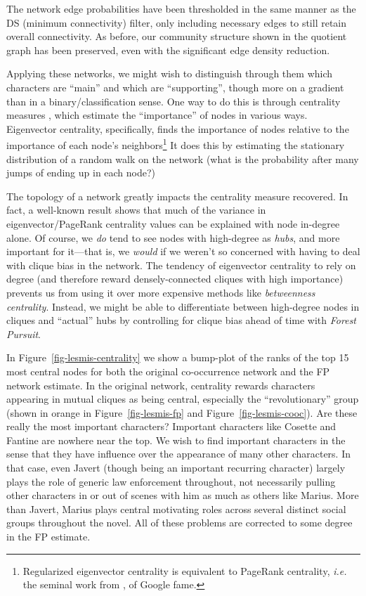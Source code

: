 \documentclass[%
	12pt,
		oneside,
		letterpaper
]{book}
\begin{document}
The network edge probabilities have been thresholded in the same manner
as the DS (minimum connectivity) filter, only including necessary edges
to still retain overall connectivity. As before, our community structure
shown in the quotient graph has been preserved, even with the
significant edge density reduction.

Applying these networks, we might wish to distinguish through them which
characters are ``main'' and which are ``supporting'', though more on a
gradient than in a binary/classification sense. One way to do this is
through centrality measures
\autocite{Mathematicsnetworks_Newman2018,atlasaspiringnetwork_Coscia2021},
which estimate the ``importance'' of nodes in various ways. Eigenvector
centrality, specifically, finds the importance of nodes relative to the
importance of each node's neighbors\footnote{ Regularized eigenvector
  centrality is equivalent to PageRank centrality, \emph{i.e.} the
  seminal work from \autocite{PageRankCitationRanking_Page1999}, of
  Google fame.} It does this by estimating the stationary distribution
of a random walk on the network (what is the probability after many
jumps of ending up in each node?)

The topology of a network greatly impacts the centrality measure
recovered. In fact, a well-known result shows that much of the variance
in eigenvector/PageRank centrality values can be explained with node
in-degree alone.\autocite{ApproximatingPageRankDegree_Fortunato} Of
course, we \emph{do} tend to see nodes with high-degree as \emph{hubs},
and more important for it---that is, we \emph{would} if we weren't so
concerned with having to deal with clique bias in the network. The
tendency of eigenvector centrality to rely on degree (and therefore
reward densely-connected cliques with high importance) prevents us from
using it over more expensive methods like \emph{betweenness centrality}.
Instead, we might be able to differentiate between high-degree nodes in
cliques and ``actual'' hubs by controlling for clique bias ahead of time
with \emph{Forest Pursuit}.

In Figure~\ref{fig-lesmis-centrality} we show a bump-plot of the ranks
of the top 15 most central nodes for both the original co-occurrence
network and the FP network estimate. In the original network, centrality
rewards characters appearing in mutual cliques as being central,
especially the ``revolutionary'' group (shown in orange in
Figure~\ref{fig-lesmis-fp} and Figure~\ref{fig-lesmis-cooc}). Are these
really the most important characters? Important characters like Cosette
and Fantine are nowhere near the top. We wish to find important
characters in the sense that they have influence over the appearance of
many other characters. In that case, even Javert (though being an
important recurring character) largely plays the role of generic law
enforcement throughout, not necessarily pulling other characters in or
out of scenes with him as much as others like Marius. More than Javert,
Marius plays central motivating roles across several distinct social
groups throughout the novel. All of these problems are corrected to some
degree in the FP estimate.
\end{document}
